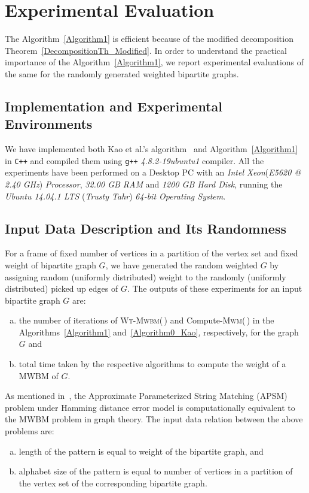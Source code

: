 \documentclass[runningheads,a4paper]{llncs}
\begin{document}
\section{Experimental Evaluation} \label{mwbm:Experiments}
The Algorithm~\ref{Algorithm1} is efficient because of the modified decomposition Theorem~\ref{DecompositionTh_Modified}.
In order to understand the practical importance of the Algorithm~\ref{Algorithm1}, we report experimental evaluations of the same for the randomly generated weighted bipartite graphs. 


\subsection{Implementation and Experimental Environments}
We have implemented both Kao et al.'s algorithm~\cite{kao02}  and Algorithm~\ref{Algorithm1} in \verb|C++| and compiled them using \verb|g++| \textit{4.8.2-19ubuntu1} compiler.
All the experiments have been performed on a Desktop PC with an  
\textit{Intel}\textsuperscript{\textregistered} \textit{Xeon}\textsuperscript{\textregistered}(\textit{E5620 @ 2.40 GHz}) \textit{Processor}, \textit{32.00 GB RAM} and \textit{1200 GB Hard Disk}, running the \textit{Ubuntu 14.04.1 LTS} (\textit{Trusty Tahr}) \textit{64-bit Operating System}.

\subsection{Input Data Description and Its Randomness}
For a frame of fixed number of vertices in a partition of  the vertex set  and fixed weight of  bipartite graph $G$, we have generated the random weighted $G$ by assigning random (uniformly distributed) weight to the randomly (uniformly distributed) picked up edges of $G$. 
The outputs of these experiments for an input bipartite graph $G$ are:
\begin{enumerate}[(a)]
\item the number of iterations of \textsc{Wt-Mwbm}(\,) and Compute-\textsc{Mwm}(\,) in the Algorithms~\ref{Algorithm1} and~\ref{Algorithm0_Kao}, respectively, for the graph $G$ and
\item total time taken by the respective algorithms to compute the weight of a MWBM of $G$.  
\end{enumerate}




As mentioned in~\cite{hazay07},
the Approximate Parameterized String Matching (APSM) problem under Hamming distance error model is computationally equivalent to the MWBM problem in graph theory. 
The input data relation between the above problems are:
\begin{enumerate}[(a)]
\item length of the pattern is equal to  weight of the bipartite graph, and
\item alphabet size of the pattern is equal to number of vertices in a partition of the vertex set of the corresponding bipartite graph.  
\end{enumerate} 
\end{document}

